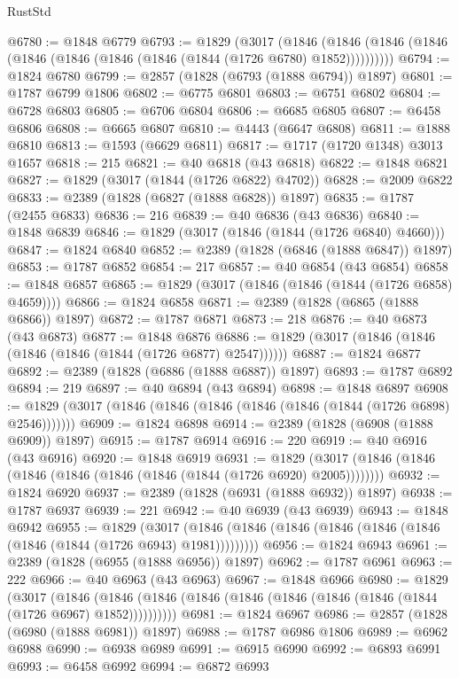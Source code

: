 \begin{lexlean}{RustStd}
\begin{coremodule}
@6780 := @1848 @6779
@6793 := @1829
    (@3017
      (@1846 (@1846 (@1846 (@1846 (@1846 (@1846 (@1846 (@1846 (@1844 (@1726 @6780) @1852))))))))))
@6794 := @1824 @6780
@6799 := @2857 (@1828 (@6793 (@1888 @6794)) @1897)
@6801 := @1787 @6799 @1806
@6802 := @6775 @6801
@6803 := @6751 @6802
@6804 := @6728 @6803
@6805 := @6706 @6804
@6806 := @6685 @6805
@6807 := @6458 @6806
@6808 := @6665 @6807
@6810 := @4443 (@6647 @6808)
@6811 := @1888 @6810
@6813 := @1593 (@6629 @6811)
@6817 := @1717 (@1720 @1348) @3013 @1657
@6818 := 215
@6821 := @40 @6818 (@43 @6818)
@6822 := @1848 @6821
@6827 := @1829 (@3017 (@1844 (@1726 @6822) @4702))
@6828 := @2009 @6822
@6833 := @2389 (@1828 (@6827 (@1888 @6828)) @1897)
@6835 := @1787 (@2455 @6833)
@6836 := 216
@6839 := @40 @6836 (@43 @6836)
@6840 := @1848 @6839
@6846 := @1829 (@3017 (@1846 (@1844 (@1726 @6840) @4660)))
@6847 := @1824 @6840
@6852 := @2389 (@1828 (@6846 (@1888 @6847)) @1897)
@6853 := @1787 @6852
@6854 := 217
@6857 := @40 @6854 (@43 @6854)
@6858 := @1848 @6857
@6865 := @1829 (@3017 (@1846 (@1846 (@1844 (@1726 @6858) @4659))))
@6866 := @1824 @6858
@6871 := @2389 (@1828 (@6865 (@1888 @6866)) @1897)
@6872 := @1787 @6871
@6873 := 218
@6876 := @40 @6873 (@43 @6873)
@6877 := @1848 @6876
@6886 := @1829 (@3017 (@1846 (@1846 (@1846 (@1846 (@1844 (@1726 @6877) @2547))))))
@6887 := @1824 @6877
@6892 := @2389 (@1828 (@6886 (@1888 @6887)) @1897)
@6893 := @1787 @6892
@6894 := 219
@6897 := @40 @6894 (@43 @6894)
@6898 := @1848 @6897
@6908 := @1829 (@3017 (@1846 (@1846 (@1846 (@1846 (@1846 (@1844 (@1726 @6898) @2546)))))))
@6909 := @1824 @6898
@6914 := @2389 (@1828 (@6908 (@1888 @6909)) @1897)
@6915 := @1787 @6914
@6916 := 220
@6919 := @40 @6916 (@43 @6916)
@6920 := @1848 @6919
@6931 := @1829 (@3017 (@1846 (@1846 (@1846 (@1846 (@1846 (@1846 (@1844 (@1726 @6920) @2005))))))))
@6932 := @1824 @6920
@6937 := @2389 (@1828 (@6931 (@1888 @6932)) @1897)
@6938 := @1787 @6937
@6939 := 221
@6942 := @40 @6939 (@43 @6939)
@6943 := @1848 @6942
@6955 := @1829
    (@3017 (@1846 (@1846 (@1846 (@1846 (@1846 (@1846 (@1846 (@1844 (@1726 @6943) @1981)))))))))
@6956 := @1824 @6943
@6961 := @2389 (@1828 (@6955 (@1888 @6956)) @1897)
@6962 := @1787 @6961
@6963 := 222
@6966 := @40 @6963 (@43 @6963)
@6967 := @1848 @6966
@6980 := @1829
    (@3017
      (@1846 (@1846 (@1846 (@1846 (@1846 (@1846 (@1846 (@1846 (@1844 (@1726 @6967) @1852))))))))))
@6981 := @1824 @6967
@6986 := @2857 (@1828 (@6980 (@1888 @6981)) @1897)
@6988 := @1787 @6986 @1806
@6989 := @6962 @6988
@6990 := @6938 @6989
@6991 := @6915 @6990
@6992 := @6893 @6991
@6993 := @6458 @6992
@6994 := @6872 @6993

\end{coremodule}
\end{lexlean}
